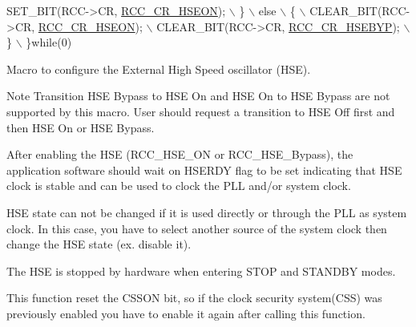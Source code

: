 \begin{DoxyCode}
                        SET\_BIT(RCC->CR, \hyperlink{group___peripheral___registers___bits___definition_gadb8228c9020595b4cf9995137b8c9a7d}{RCC\_CR\_HSEON});                     \(\backslash\)
                      \}                                                     \(\backslash\)
                      else                                                  \(\backslash\)
                      \{                                                     \(\backslash\)
                        CLEAR\_BIT(RCC->CR, \hyperlink{group___peripheral___registers___bits___definition_gadb8228c9020595b4cf9995137b8c9a7d}{RCC\_CR\_HSEON});                   \(\backslash\)
                        CLEAR\_BIT(RCC->CR, \hyperlink{group___peripheral___registers___bits___definition_gaa3288090671af5a959aae4d7f7696d55}{RCC\_CR\_HSEBYP});                  \(\backslash\)
                      \}                                                     \(\backslash\)
                    \}\textcolor{keywordflow}{while}(0)
\end{DoxyCode}


Macro to configure the External High Speed oscillator (H\+SE). 

\begin{DoxyNote}{Note}
Transition H\+SE Bypass to H\+SE On and H\+SE On to H\+SE Bypass are not supported by this macro. User should request a transition to H\+SE Off first and then H\+SE On or H\+SE Bypass. 

After enabling the H\+SE (R\+C\+C\+\_\+\+H\+S\+E\+\_\+\+ON or R\+C\+C\+\_\+\+H\+S\+E\+\_\+\+Bypass), the application software should wait on H\+S\+E\+R\+DY flag to be set indicating that H\+SE clock is stable and can be used to clock the P\+LL and/or system clock. 

H\+SE state can not be changed if it is used directly or through the P\+LL as system clock. In this case, you have to select another source of the system clock then change the H\+SE state (ex. disable it). 

The H\+SE is stopped by hardware when entering S\+T\+OP and S\+T\+A\+N\+D\+BY modes. 

This function reset the C\+S\+S\+ON bit, so if the clock security system(\+C\+S\+S) was previously enabled you have to enable it again after calling this function. 
\end{DoxyNote}

